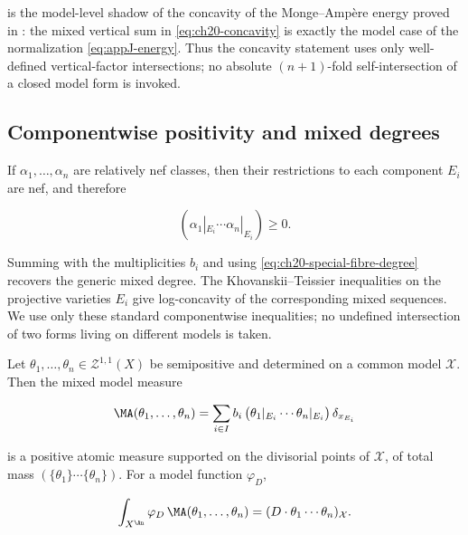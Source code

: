  is the model-level shadow of the concavity of the
Monge--Amp\`ere energy proved in : the mixed vertical
sum in \eqref{eq:ch20-concavity} is exactly the model case of the
normalization \eqref{eq:appJ-energy}.  Thus the concavity statement uses only
well-defined vertical-factor intersections; no absolute
$(n+1)$-fold self-intersection of a closed model form is invoked.

\subsection{Componentwise positivity and mixed degrees}
\label{sec:ch20-componentwise}

If $\alpha_1,\ldots,\alpha_n$ are relatively nef classes, then their
restrictions to each component $E_i$ are nef, and therefore

\begin{equation}
\label{eq:ch20-mixed-component-positive}
        (\alpha_1|_{E_i}\cdots\alpha_n|_{E_i})\geq0.
\end{equation}

Summing with the multiplicities $b_i$ and using
\eqref{eq:ch20-special-fibre-degree} recovers the generic mixed degree.
The Khovanskii--Teissier inequalities on the projective varieties $E_i$
give log-concavity of the corresponding mixed sequences.  We use only these
standard componentwise inequalities; no undefined intersection of two forms
living on different models is taken.

\begin{proposition}
\label{prop:ch20-measure-positivity}
Let $\theta_1,\ldots,\theta_n\in\mathcal Z^{1,1}(X)$ be semipositive and
determined on a common model $\mathcal X$.  Then the mixed model measure

\begin{equation}
\label{eq:ch20-model-measure}
 \MA(\theta_1,\ldots,\theta_n)
 =\sum_{i\in I}b_i\,
   \bigl(\theta_{1}|_{E_i}\cdots\theta_{n}|_{E_i}\bigr)\,
   \delta_{x_{E_i}}
\end{equation}

is a positive atomic measure supported on the divisorial points of
$\mathcal X$, of total mass $(\{\theta_1\}\cdots\{\theta_n\})$.  For a
model function $\varphi_D$,

\begin{equation}
\label{eq:ch20-measure-pairing}
 \int_{X^{\An}}\varphi_D\,\MA(\theta_1,\ldots,\theta_n)
 =(D\cdot\theta_1\cdots\theta_n)_{\mathcal X}.
\end{equation}
\end{proposition}

